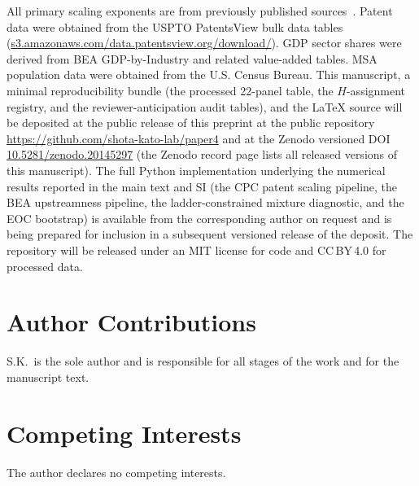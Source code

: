 All primary scaling exponents are from previously published
sources~\cite{Bettencourt2007,Bettencourt2013}.
Patent data were obtained from the USPTO PatentsView bulk data tables
(\href{https://s3.amazonaws.com/data.patentsview.org/download/}{s3.amazonaws.com/\allowbreak data.patentsview.org/\allowbreak download/}).
GDP sector shares were derived from BEA GDP-by-Industry and related
value-added tables.
MSA population data were obtained from the U.S. Census Bureau.
This manuscript, a minimal reproducibility bundle (the processed
22-panel table, the $H$-assignment registry, and the reviewer-anticipation
audit tables), and the LaTeX source will be deposited at the public release of this preprint at the public repository
\url{https://github.com/shota-kato-lab/paper4}
and at the Zenodo versioned DOI
\href{https://doi.org/10.5281/zenodo.20145297}{10.5281/zenodo.20145297}
(the Zenodo record page lists all released versions of this manuscript).
The full Python implementation underlying the numerical results reported
in the main text and SI (the CPC patent scaling pipeline, the BEA
upstreamness pipeline, the ladder-constrained mixture diagnostic, and
the EOC bootstrap) is available from the corresponding author on request
and is being prepared for inclusion in a subsequent versioned release of
the deposit. The repository will be released under an MIT license for code
and CC\,BY\,4.0 for processed data.

\section*{Author Contributions}

S.K.\ is the sole author and is responsible for all stages of the work and for the manuscript text.

\section*{Competing Interests}

The author declares no competing interests.






